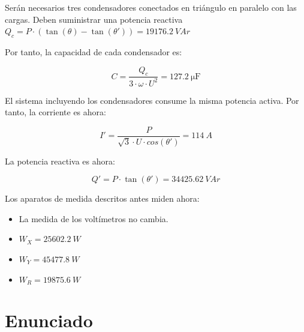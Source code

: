 Serán necesarios tres condensadores conectados en triángulo en
paralelo con las cargas. Deben suministrar una potencia reactiva
$Q_c = P \cdot (\tan(\theta) - \tan(\theta')) = \SI{19176.2}{VAr}$

Por tanto, la capacidad de cada condensador es:

\[
  C = \frac{Q_c}{3 \cdot \omega \cdot U^2} = \SI{127.2}{\micro\farad}
\]

El sistema incluyendo los condensadores consume la misma potencia
activa. Por tanto, la corriente es ahora:

\[I' = \frac{P}{\sqrt{3} \cdot U \cdot cos(\theta')} = \SI{114}{A}\]

La potencia reactiva es ahora:

\[
  Q' = P \cdot \tan(\theta') = \SI{34425.62}{VAr}
\]

Los aparatos de medida descritos antes miden ahora:
\begin{itemize}
\item La medida de los voltímetros no cambia.
\item $W_X = \SI{25602.2}{W}$
\item $W_Y = \SI{45477.8}{W}$
\item $W_R = \SI{19875.6}{W}$
\end{itemize}


\section{Enunciado}


